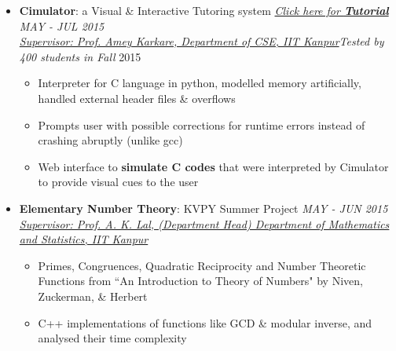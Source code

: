 \documentclass[letterpaper,11pt]{article}
\begin{document}
{\begin{itemize}
\begin{itemize}
            \item Studied how non local correlations of quantum states can be used to generate certified randomness
                \vspace{-2pt}
        \end{itemize}
    \item \textbf{Cimulator}: a Visual \& Interactive Tutoring system\hspace{0.2in} \href{http://home.iitk.ac.in/~kunalkap/Cimulator.html}{\textit{Click here for \textbf{Tutorial}}} \hfill \textit{MAY - JUL 2015} \\
        \href{http://www.cse.iitk.ac.in/users/karkare/}{\textit{Supervisor: Prof. Amey Karkare, Department of CSE, IIT Kanpur}}\hfill \textit{Tested by 400 students in Fall} 2015\\
        \vspace{-5pt}
        \begin{itemize}
            \item Interpreter for C language in python, modelled memory artificially, handled external header files \& overflows
                \vspace{-2pt}
            \item Prompts user with possible corrections for runtime errors instead of crashing abruptly (unlike gcc)
                \vspace{-2pt}
            \item Web interface to \textbf{simulate C codes} that were interpreted by Cimulator to provide visual cues to the user
                \vspace{-2pt}
        \end{itemize}
        \vspace{-5pt}
    \item \textbf{Elementary Number Theory}: KVPY Summer Project \hfill \textit{MAY - JUN 2015}\\
        \href{http://home.iitk.ac.in/~arlal/}{\textit{Supervisor: Prof. A. K. Lal, (Department Head) Department of Mathematics and Statistics, IIT Kanpur}}
        \vspace{-5pt}
        \begin{itemize}
            \item Primes, Congruences, Quadratic Reciprocity and Number Theoretic Functions from ``An Introduction to Theory of Numbers" by Niven, Zuckerman, \& Herbert
            \vspace{-2pt}
            \item C++ implementations of functions like GCD \& modular inverse, and analysed their time complexity

\end{itemize}
\end{itemize}}
\end{document}
